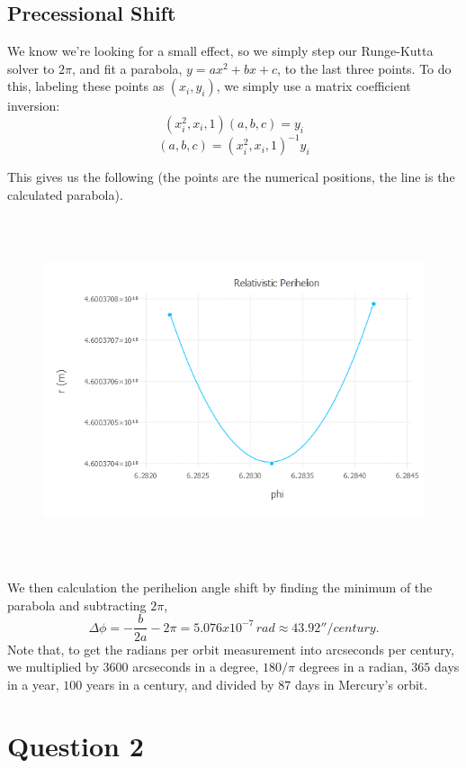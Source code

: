 \documentclass{article}
\begin{document}
\subsection{Precessional Shift}
We know we're looking for a small effect, so we simply step our Runge-Kutta solver to $2\pi$, and fit a parabola, $y = ax^2 + bx +c$, to the last three points. To do this, labeling these points as $(x_i, y_i)$, we simply use a matrix coefficient inversion:
$$(x_i^2,x_i,1) (a,b,c) = y_i$$
$$(a,b,c) = (x_i^2,x_i,1)^{-1}y_i$$

This gives us the following (the points are the numerical positions, the line is the calculated parabola).

\begin{figure}[H]
	\includegraphics[width=6in,height=4in]{"Relativistic Perihelion"}
\end{figure}

We then calculation the perihelion angle shift by finding the minimum of the parabola and subtracting $2\pi$,
$$\Delta\phi = -\frac{b}{2a} - 2\pi = 5.076 x 10^{-7} \,rad \approx 43.92'' / century.$$
Note that, to get the radians per orbit measurement into arcseconds per century, we multiplied by $3600$ arcseconds in a degree, $180/\pi$ degrees in a radian, $365$ days in a year, $100$ years in a century, and divided by $87$ days in Mercury's orbit.




\section{Question 2}
\end{document}
